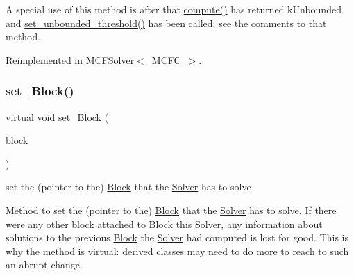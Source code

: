 A special use of this method is after that \mbox{\hyperlink{class_s_m_spp__di__unipi__it_1_1_solver_a504d4e3e174c7a518cc66156a8a45ce5}{compute()}} has returned k\+Unbounded and \mbox{\hyperlink{class_s_m_spp__di__unipi__it_1_1_solver_ae1717d1363782e086aa797e7437c0352}{set\+\_\+unbounded\+\_\+threshold()}} has been called; see the comments to that method. 

Reimplemented in \mbox{\hyperlink{class_s_m_spp__di__unipi__it_1_1_m_c_f_solver_a62678dc9f7485d5a2992c588c5dc7d49}{M\+C\+F\+Solver$<$ M\+C\+F\+C $>$}}.

\mbox{\label{class_s_m_spp__di__unipi__it_1_1_solver_a73965be2cfab47947f0166116bf4a3cc}} 
\subsubsection{\texorpdfstring{set\+\_\+\+Block()}{set\_Block()}}
{\footnotesize\ttfamily virtual void set\+\_\+\+Block (\begin{DoxyParamCaption}\item[{\mbox{\hyperlink{class_s_m_spp__di__unipi__it_1_1_block}{Block}} $\ast$}]{block }\end{DoxyParamCaption})\hspace{0.3cm}{\ttfamily [virtual]}}



set the (pointer to the) \mbox{\hyperlink{class_s_m_spp__di__unipi__it_1_1_block}{Block}} that the \mbox{\hyperlink{class_s_m_spp__di__unipi__it_1_1_solver}{Solver}} has to solve 

Method to set the (pointer to the) \mbox{\hyperlink{class_s_m_spp__di__unipi__it_1_1_block}{Block}} that the \mbox{\hyperlink{class_s_m_spp__di__unipi__it_1_1_solver}{Solver}} has to solve. If there were any other block attached to \mbox{\hyperlink{class_s_m_spp__di__unipi__it_1_1_block}{Block}} this \mbox{\hyperlink{class_s_m_spp__di__unipi__it_1_1_solver}{Solver}}, any information about solutions to the previous \mbox{\hyperlink{class_s_m_spp__di__unipi__it_1_1_block}{Block}} the \mbox{\hyperlink{class_s_m_spp__di__unipi__it_1_1_solver}{Solver}} had computed is lost for good. This is why the method is virtual\+: derived classes may need to do more to reach to such an abrupt change.

